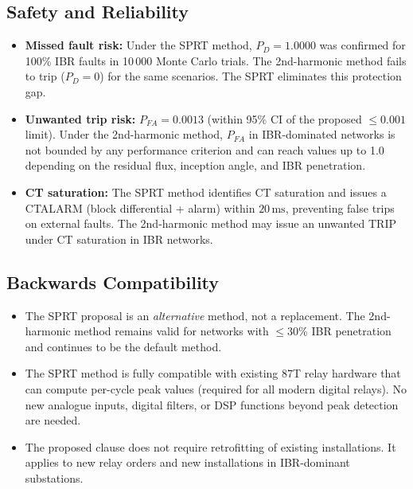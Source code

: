 \documentclass[11pt, a4paper]{article}
\newcommand{\ms}{\,\text{ms}}
\begin{document}
\subsection{Safety and Reliability}

\begin{itemize}
  \item \textbf{Missed fault risk:} Under the SPRT method, $P_D = 1.0000$
    was confirmed for 100\% IBR faults in 10\,000 Monte Carlo trials.
    The 2nd-harmonic method fails to trip ($P_D = 0$) for the same
    scenarios.  The SPRT eliminates this protection gap.

  \item \textbf{Unwanted trip risk:} $P_{FA} = 0.0013$ (within 95\% CI of
    the proposed $\leq 0.001$ limit).  Under the 2nd-harmonic method,
    $P_{FA}$ in IBR-dominated networks is not bounded by any performance
    criterion and can reach values up to 1.0 depending on the residual
    flux, inception angle, and IBR penetration.

  \item \textbf{CT saturation:} The SPRT method identifies CT saturation
    and issues a CTALARM (block differential + alarm) within $20\ms$,
    preventing false trips on external faults.  The 2nd-harmonic method
    may issue an unwanted TRIP under CT saturation in IBR networks.
\end{itemize}

\subsection{Backwards Compatibility}

\begin{itemize}
  \item The SPRT proposal is an \emph{alternative} method, not a replacement.
    The 2nd-harmonic method remains valid for networks with $\leq 30\%$ IBR
    penetration and continues to be the default method.

  \item The SPRT method is fully compatible with existing 87T relay hardware
    that can compute per-cycle peak values (required for all modern digital
    relays).  No new analogue inputs, digital filters, or DSP functions
    beyond peak detection are needed.

  \item The proposed clause does not require retrofitting of existing
    installations.  It applies to new relay orders and new installations
    in IBR-dominant substations.
\end{itemize}
\end{document}
